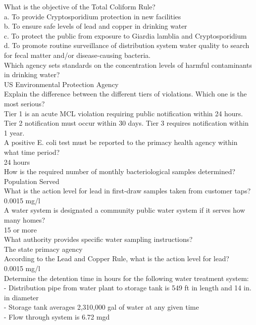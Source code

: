 What is the objective of the Total Coliform Rule?\\
a.	To provide Cryptosporidium protection in new facilities\\
b.	To ensure safe levels of lead and copper in drinking water\\
c.	To protect the public from exposure to Giardia lamblia and Cryptosporidium\\
d.		To promote routine surveillance of distribution system water quality to search for fecal matter and/or disease-causing bacteria.\\
Which agency sets standards on the concentration levels of harmful contaminants in drinking water?\\
US Environmental Protection Agency\\
Explain the difference between the different tiers of violations. Which one is the most serious?\\
Tier 1 is an acute MCL violation requiring public notification within 24 hours. Tier 2 notification must occur within 30 days. Tier 3 requires notification within 1 year.\\
A positive E. coli test must be reported to the primacy health agency within what time period?\\
24 hours\\
How is the required number of monthly bacteriological samples determined?\\
Population Served\\
What is the action level for lead in first-draw samples taken from customer taps?\\
0.0015 mg/l\\
A water system is designated a community public water system if it serves how many homes?\\
15 or more\\
What authority provides specific water sampling instructions?\\
The state primacy agency\\
According to the Lead and Copper Rule, what is the action level for lead?\\
0.0015 mg/l\\
Determine the detention time in hours for the following water treatment system:\\
-	Distribution pipe from water plant to storage tank is 549 ft in length and 14 in. in diameter\\
-	Storage tank averages 2,310,000 gal of water at any given time\\
-	Flow through system is 6.72 mgd\\
